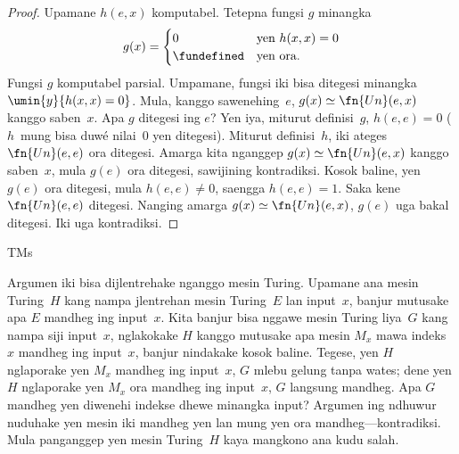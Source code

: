 \documentclass[../../../include/open-logic-section]{subfiles}
\begin{document}
\begin{proof}
Upamane $h(e,x)$ komputabel. Tetepna fungsi $g$
minangka
\[
g(x) =
\begin{cases}
  0                & \text{yen $h(x,x) = 0$} \\
  \fundefined & \text{yen ora.}
\end{cases}
\]
Fungsi $g$ komputabel parsial. Umpamane,
fungsi iki bisa ditegesi minangka
$\umin{y}{h(x,x) = 0}$. Mula, kanggo sawenehing~$e$,
$g(x) \simeq \fn{Un}(e, x)$ kanggo saben~$x$.
Apa $g$ ditegesi ing $e$? Yen iya, miturut
definisi~$g$, $h(e,e) = 0$ ($h$~mung bisa
duwé nilai~$0$ yen ditegesi). Miturut
definisi~$h$, iki ateges $\fn{Un}(e, e)$
ora ditegesi. Amarga kita nganggep
$g(x) \simeq \fn{Un}(e, x)$ kanggo saben~$x$,
mula $g(e)$ ora ditegesi, sawijining
kontradiksi. Kosok baline, yen $g(e)$ ora
ditegesi, mula $h(e,e) \neq 0$, saengga
$h(e,e) = 1$. Saka kene $\fn{Un}(e, e)$
ditegesi. Nanging amarga
$g(x) \simeq \fn{Un}(e, x)$, $g(e)$ uga
bakal ditegesi. Iki uga kontradiksi.
\end{proof}

\begin{tagblock}{TMs}
\begin{explain}
Argumen iki bisa dijlentrehake nganggo
mesin Turing. Upamane ana mesin Turing~$H$
kang nampa jlentrehan mesin Turing~$E$
lan input~$x$, banjur mutusake apa $E$
mandheg ing input~$x$. Kita banjur bisa
nggawe mesin Turing liya~$G$ kang nampa
siji input~$x$, nglakokake $H$ kanggo
mutusake apa mesin $M_x$ mawa indeks~$x$
mandheg ing input~$x$, banjur nindakake
kosok baline. Tegese, yen $H$ nglaporake
yen $M_x$ mandheg ing input~$x$, $G$
mlebu gelung tanpa wates; dene yen $H$
nglaporake yen $M_x$ ora mandheg ing
input~$x$, $G$ langsung mandheg. Apa
$G$ mandheg yen diwenehi indekse dhewe
minangka input? Argumen ing ndhuwur
nuduhake yen mesin iki mandheg yen lan
mung yen ora mandheg---kontradiksi.
Mula panganggep yen mesin Turing~$H$
kaya mangkono ana kudu salah.
\end{explain}
\end{tagblock}
\end{document}
